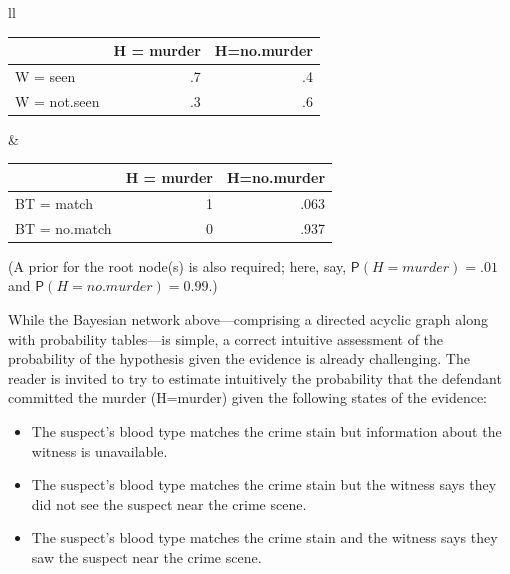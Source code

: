 \documentclass[11pt,dvipsnames,enabledeprecatedfontcommands]{scrartcl}
\newcommand{\pr}[1]{\mathsf{P}(#1)}
\begin{document}
\noindent

\begin{tabular}{ll}
\begin{minipage}[c]{0.45\linewidth}
\begin{table}[H]
\centering
\begin{tabular}{lrr}
\toprule
  & H = murder & H=no.murder\\
\midrule
W = seen & .7 & .4\\
W = not.seen & .3 & .6\\
\bottomrule
\end{tabular}
\end{table}
\end{minipage}& \begin{minipage}[c]{0.45\linewidth}
\begin{table}[H]
\centering
\begin{tabular}{lrr}
\toprule
  & H = murder & H=no.murder\\
\midrule
BT = match & 1 & .063\\
BT = no.match & 0 & .937\\
\bottomrule
\end{tabular}
\end{table}
\end{minipage}
\end{tabular}

\vspace{2mm}

\noindent (A prior for the root node(s) is also required; here, say,
\(\pr{H=murder} = .01\) and \(\pr{H= no.murder} = 0.99\).)

While the Bayesian network above---comprising a directed acyclic graph
along with probability tables---is simple, a correct intuitive
assessment of the probability of the hypothesis given the evidence is
already challenging. The reader is invited to try to estimate
intuitively the probability that the defendant committed the murder
(H=murder) given the following states of the evidence:

\begin{itemize} 
\item The suspect's blood type matches the crime stain but  information about the witness is unavailable.
\item The suspect's blood type matches the crime stain but the witness says they did not see the suspect near the crime scene.
\item The suspect's blood type matches the crime stain and the witness says they saw the suspect near the crime scene.
\end{itemize}
\end{document}
